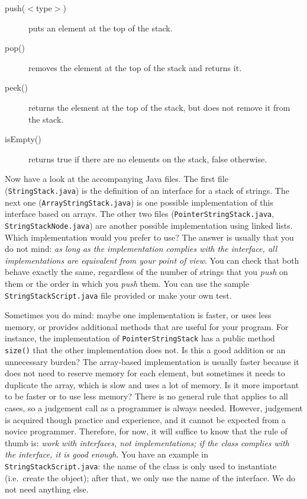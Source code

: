 \begin{description}
\item[push($<$type$>$)] puts an element at the top of the stack.
\item[pop() ] removes the element at the top of the
  stack and returns it. 
\item[peek() ] returns the element at the top of the stack, but
  does not remove it from the stack.
\item[isEmpty() ] returns true if there are no elements on the stack,
  false otherwise.
\end{description}

Now have a 
look at the accompanying Java files. 
The first file (\verb+StringStack.java+) is the definition of an
interface for a stack of strings. The next 
one (\verb+ArrayStringStack.java+) is one possible
implementation of this interface based on arrays. The other two files 
(\verb+PointerStringStack.java+, \verb+StringStackNode.java+) are
another possible implementation using linked lists. Which
implementation would you prefer to use? The answer is usually that you
do not mind: \emph{as long as the implementation complies with the
  interface, all implementations are equivalent from your point of
  view}. You can check that both behave exactly the same, regardless
of the number of strings that you \emph{push} on them or 
the order in which you \emph{push} them. You can
use the sample \verb+StringStackScript.java+ file provided or make
your own test.

Sometimes you do mind: maybe one implementation is faster, or uses
less memory, or provides additional methods that are useful for your
program. For instance, the implementation of \verb+PointerStringStack+
has a public method \verb+size()+ that the other implementation does
not. Is this a good addition or an unnecessary burden? The array-based
implementation is usually faster because it does not need to reserve
memory for each element, but sometimes it needs to duplicate the
array, which is slow and uses a lot of memory. Is it more important to
be faster or to use less memory? There is no
general rule that applies to all cases, so a judgement call as a
programmer is always needed. However, judgement is acquired though
practice and experience, and it cannot be expected from a novice
programmer. Therefore, for 
now, it will suffice to know that the rule of thumb is: \emph{work
  with interfaces, not implementations; if the class complies with the
  interface, it is good enough}. You have an example in
\verb+StringStackScript.java+: the name of the class is only used to
instantiate (i.e.~create the object); after that, we only use the name
of the interface. We do not need anything else. 

